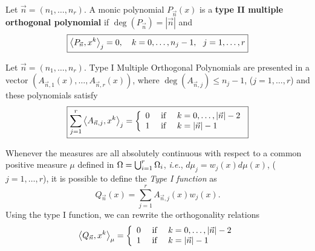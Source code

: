 \documentclass[portrait,final,a0paper,fontscale=0.38]{baposter}
\begin{document}
\begin{poster}
{\begin{multicols}{2}
    \begin{definition}
      Let $\vec n = (n_1,\dots,n_r)$. A monic polynomial $P_{\vec n}(x)$ is a \textbf{type II multiple orthogonal polynomial} if $\deg(P_{\vec n})= |\vec n|$ and 
      \begin{equation}
        \label{eq:typeII-MOP-dot}
        \boxed{\left\langle P_{\vec n} , x^k \right\rangle_j = 0, \ \ \ k=0,\dots,n_{j}-1, \ \ j = 1,\dots,r}
    \end{equation}
  \end{definition}
  \begin{definition}
    \label{def:typeI-univar}
    Let $\vec n = (n_1,\dots,n_r)$. Type I Multiple Orthogonal Polynomials are presented in a vector $(A_{\vec n, 1}(x), \dots, A_{\vec n, r}(x))$, where $\deg(A_{\vec n, j})\leq n_j-1$, ($j=1,\dots,r$) and these polynomials satisfy
    \begin{equation}
      \label{eq:typeI-MOP-dot}
      \boxed{\sum_{j=1}^r \left\langle A_{\vec n,j} , x^k \right\rangle_j = \left\{\begin{array}{ccl}
          0 &   \text{ if } & k=0,\dots,|\vec n|-2 \\
          1 & \text{ if } & k=|\vec n|-1      
      \end{array}\right.}
    \end{equation}
  \end{definition}
  Whenever the measures are all absolutely continuous with respect to a common positive measure $\mu$ defined in $\Omega =\nolinebreak \bigcup_{i=1}^r \Omega_i$, \textit{i.e.}, $d\mu_j = w_j(x) d\mu(x)$, ($j=1,\dots,r$), it is possible to define the \textit{Type I function} as
  \begin{equation}
      \label{eq:typeI-function}
      Q_{\vec n}(x)=\sum_{j=1}^r A_{\vec n,j}(x)w_j(x).
  \end{equation}
  Using the type I function, we can rewrite the orthogonality relations
  \begin{equation}
      \label{eq:typeI-MOP-function}
      \left\langle Q_{\vec n} , x^k \right\rangle_\mu = \left\{\begin{array}{ccl}
          0 &   \text{ if } & k=0,\dots,|\vec n|-2 \\
          1 & \text{ if } & k=|\vec n|-1      
      \end{array}\right.
  \end{equation}
  \end{multicols}
	}
%
%
{
\begin{multicols}{2}


\end{multicols}}
\end{poster}
\end{document}
